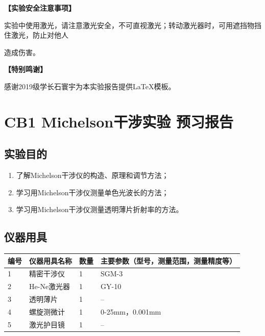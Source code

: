 \documentclass[dvipsnames, svgnames,a4paper,11pt]{article}
\begin{document}
	\textbf{【实验安全注意事项】}	
	
	实验中使用激光，请注意激光安全，不可直视激光；转动激光器时，可用遮挡物挡住激光，防止对他人
	
	造成伤害。
	
	\textbf{【特别鸣谢】}	
	
	感谢2019级学长石寰宇为本实验报告提供\LaTeX 模板。
	
	
	
	\clearpage
	\tableofcontents
	\clearpage
	
	
	
	\setcounter{section}{0}
	\section{CB1 Michelson干涉实验 \quad\heiti 预习报告}
	
	\subsection{实验目的}
	\begin{enumerate}
		\item 了解Michelson干涉仪的构造、原理和调节方法；
		\item 学习用Michelson干涉仪测量单色光波长的方法；
		\item 学习用Michelson干涉仪测量透明薄片折射率的方法。
	\end{enumerate}
	
	\subsection{仪器用具}
	\begin{table}[htbp]
		\centering
		\renewcommand\arraystretch{1.6}
		\begin{tabular}{p{}|p{}|p{}|p{}}
			\hline
			编号& 仪器用具名称 & 数量 &  主要参数（型号，测量范围，测量精度等） \\
			\hline
			1& 精密干涉仪 &1 & SGM-3 \\
			
			2& He-Ne激光器 &1 & GY-10 \\
			
			3& 透明薄片 & 1 & -- \\
			
			4& 螺旋测微计 & 1 & 0-25mm，0.001mm \\
			
			5& 激光护目镜 & 1 & -- \\
			\hline
		\end{tabular}
	\end{table}
	
\end{document}
